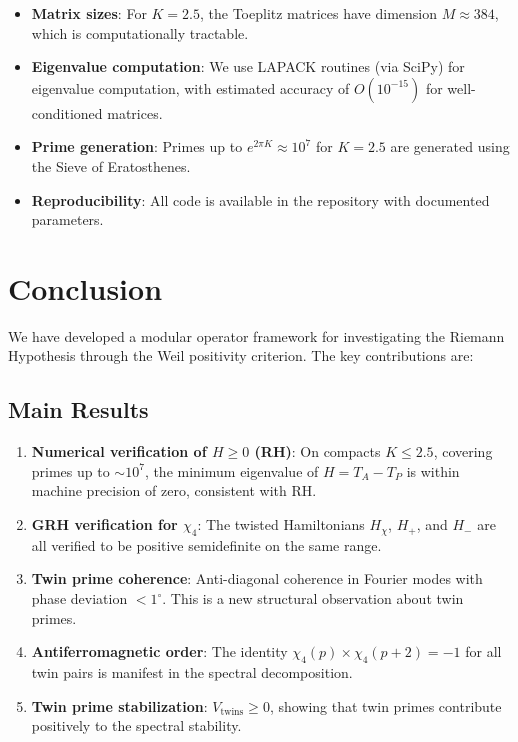 \begin{itemize}
  \item \textbf{Matrix sizes}: For $K = 2.5$, the Toeplitz matrices have dimension $M \approx 384$, which is computationally tractable.

  \item \textbf{Eigenvalue computation}: We use LAPACK routines (via SciPy) for eigenvalue computation, with estimated accuracy of $O(10^{-15})$ for well-conditioned matrices.

  \item \textbf{Prime generation}: Primes up to $e^{2\pi K} \approx 10^7$ for $K = 2.5$ are generated using the Sieve of Eratosthenes.

  \item \textbf{Reproducibility}: All code is available in the repository with documented parameters.
\end{itemize}

\section{Conclusion}\label{sec:conclusion}

We have developed a modular operator framework for investigating the Riemann Hypothesis through the Weil positivity criterion. The key contributions are:

\subsection{Main Results}

\begin{enumerate}
  \item \textbf{Numerical verification of $H \geq 0$ (RH)}: On compacts $K \leq 2.5$, covering primes up to $\sim 10^7$, the minimum eigenvalue of $H = T_A - T_P$ is within machine precision of zero, consistent with RH.

  \item \textbf{GRH verification for $\chi_4$}: The twisted Hamiltonians $H_\chi$, $H_+$, and $H_-$ are all verified to be positive semidefinite on the same range.

  \item \textbf{Twin prime coherence}: Anti-diagonal coherence in Fourier modes with phase deviation $< 1^\circ$. This is a new structural observation about twin primes.

  \item \textbf{Antiferromagnetic order}: The identity $\chi_4(p) \times \chi_4(p+2) = -1$ for all twin pairs is manifest in the spectral decomposition.

  \item \textbf{Twin prime stabilization}: $V_{\mathrm{twins}} \geq 0$, showing that twin primes contribute positively to the spectral stability.
\end{enumerate}

